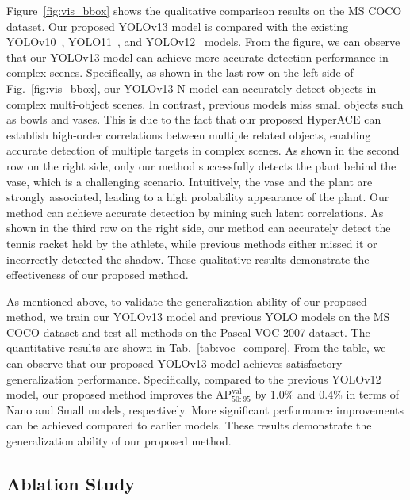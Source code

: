 Figure~\ref{fig:vis_bbox} shows the qualitative comparison results on the MS COCO dataset. Our proposed YOLOv13 model is compared with the existing YOLOv10~\cite{yolov10}, YOLO11~\cite{yolo11}, and YOLOv12~\cite{yolov12} models. From the figure, we can observe that our YOLOv13 model can achieve more accurate detection performance in complex scenes. Specifically, as shown in the last row on the left side of Fig.~\ref{fig:vis_bbox}, our YOLOv13-N model can accurately detect objects in complex multi-object scenes. In contrast, previous models miss small objects such as bowls and vases. This is due to the fact that our proposed HyperACE can establish high-order correlations between multiple related objects, enabling accurate detection of multiple targets in complex scenes. As shown in the second row on the right side, only our method successfully detects the plant behind the vase, which is a challenging scenario. Intuitively, the vase and the plant are strongly associated, leading to a high probability appearance of the plant. Our method can achieve accurate detection by mining such latent correlations. As shown in the third row on the right side, our method can accurately detect the tennis racket held by the athlete, while previous methods either missed it or incorrectly detected the shadow. These qualitative results demonstrate the effectiveness of our proposed method.


As mentioned above, to validate the generalization ability of our proposed method, we train our YOLOv13 model and previous YOLO models on the MS COCO dataset and test all methods on the Pascal VOC 2007 dataset. The quantitative results are shown in Tab.~\ref{tab:voc_compare}. From the table, we can observe that our proposed YOLOv13 model achieves satisfactory generalization performance. Specifically, compared to the previous YOLOv12 model, our proposed method improves the $\text{AP}_{50:95}^\text{val}$ by 1.0\% and 0.4\% in terms of Nano and Small models, respectively. More significant performance improvements can be achieved compared to earlier models. These results demonstrate the generalization ability of our proposed method.



\subsection{Ablation Study}
\label{sec:ablation}
